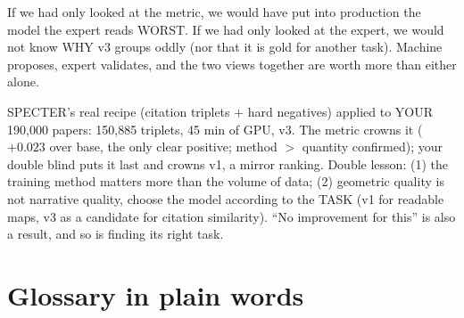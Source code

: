 \documentclass[11pt,a4paper]{article}
\begin{document}
\begin{ojo}
If we had only looked at the metric, we would have put into production the model the expert
reads WORST. If we had only looked at the expert, we would not know WHY v3 groups oddly (nor
that it is gold for another task). Machine proposes, expert validates, and the two views
together are worth more than either alone.
\end{ojo}

\begin{resumen}
SPECTER's real recipe (citation triplets $+$ hard negatives) applied to YOUR 190,000 papers:
150,885 triplets, 45 min of GPU, v3. The metric crowns it ($+0.023$ over base, the only clear
positive; method $>$ quantity confirmed); your double blind puts it last and crowns v1, a mirror
ranking. Double lesson: (1) the training method matters more than the volume of data; (2)
geometric quality is not narrative quality, choose the model according to the TASK (v1 for
readable maps, v3 as a candidate for citation similarity). ``No improvement for this'' is also a
result, and so is finding its right task.
\end{resumen}
\clearpage
{}
{}

\section{Glossary in plain words}
\end{document}
